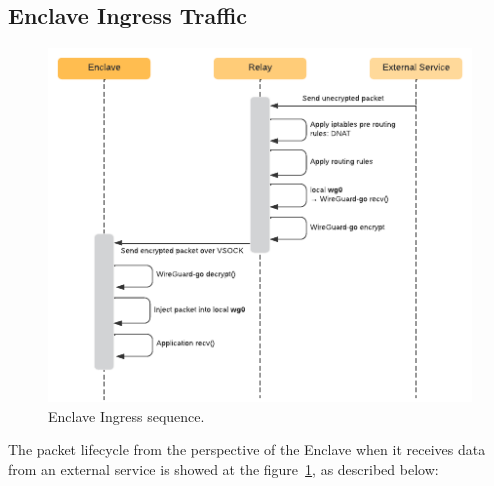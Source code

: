 \documentclass[a4paper, twocolumn]{article}
\begin{document}
\subsection{Enclave Ingress Traffic}

\begin{figure}
  \centering
  \includegraphics[width=\linewidth,keepaspectratio]{ingress-sequence.pdf}
  \caption{Enclave Ingress sequence.}\label{fig:ingress-sequence1}
\end{figure}

The packet lifecycle from the perspective of the Enclave when it receives data
from an external service is showed at the figure~\ref{fig:ingress-sequence1},
as described below:
\end{document}
